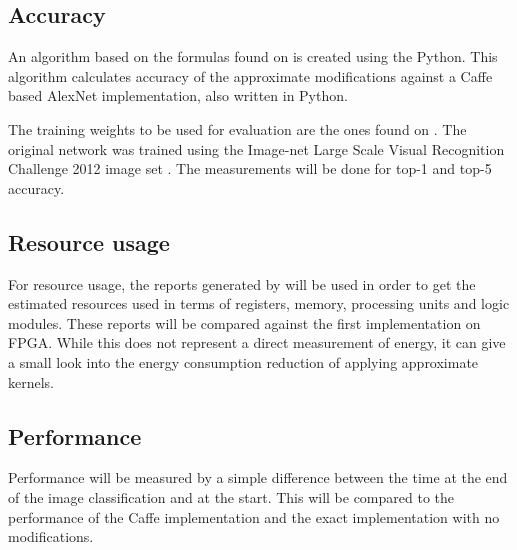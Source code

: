 \subsection{Accuracy}

An algorithm based on the formulas found on \cite{googledev} is created using the Python. This algorithm
calculates accuracy of the approximate modifications against a Caffe \cite{jia2014caffe} based AlexNet implementation,
also written in Python.

The training weights to be used for evaluation are the ones found on \cite{donahue2012bvlc}. The original network
was trained using the Image-net Large Scale Visual Recognition Challenge 2012 image set \cite{lsvrc}.
The measurements will be done for top-1 and top-5 accuracy.

\subsection{Resource usage}

For resource usage, the reports generated by \intelOCL will be used in order to get the estimated
resources used in terms of registers, memory, processing units and logic modules.
These reports will be compared against the first implementation on FPGA.
While this does not represent a direct measurement of energy, it can give a small look
into the energy consumption reduction of applying approximate kernels.

\subsection{Performance}

Performance will be measured by a simple difference between the time 
at the end of the image classification and at the start.
This will be compared to the performance of the Caffe implementation 
and the exact implementation with no modifications.
